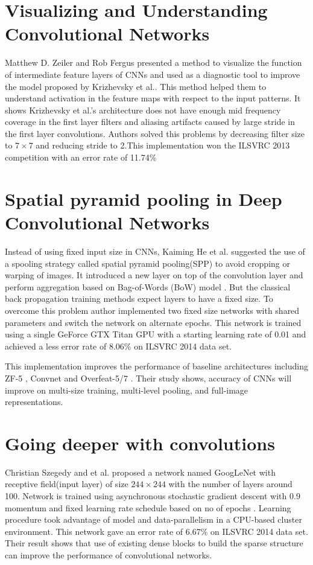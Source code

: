 \documentclass{article}
\begin{document}
\section{Visualizing and Understanding Convolutional Networks}

Matthew D. Zeiler and Rob Fergus\cite{Zeiler2013} presented a method to visualize the function of intermediate feature layers of CNNs and used as a diagnostic tool to improve  the model proposed by Krizhevsky et al.\cite{Krizhevsky2012a}. This method helped  them  to understand  activation in the feature maps with respect to the input patterns. It shows Krizhevsky et al.'s architecture does not have  enough mid frequency coverage in the first layer filters and aliasing artifacts caused by  large stride in the first layer convolutions. Authors solved this problems by decreasing filter size to $7\times7$ and reducing stride to 2.This implementation won the  ILSVRC 2013 competition with an error rate of 11.74\%



\section{Spatial pyramid pooling in Deep Convolutional Networks}
Instead of using fixed input size in CNNs, Kaiming He et al.\cite{He2014} suggested  the use of a spooling strategy called  spatial pyramid pooling(SPP)\cite{Grauman2005}\cite{1641019} to avoid cropping or warping of  images. It introduced a new layer on top of the convolution layer and perform aggregation  based on Bag-of-Words (BoW) model \cite{Sivic2003}. But the classical back propagation training methods expect layers to have a fixed   size. To overcome this problem author implemented two fixed size networks with shared parameters and switch the network on alternate epochs. This network is trained using a single GeForce GTX Titan GPU with a starting  learning rate of 0.01 and achieved  a less  error rate of 8.06\% on  ILSVRC 2014 data set. 
\par 
This implementation improves the performance of baseline architectures including ZF-5\cite{Zeiler2013} , Convnet \cite{Krizhevsky2012a} and Overfeat-5/7 \cite{Sermanet2013}. Their study shows, accuracy of CNNs will improve on multi-size training, multi-level pooling, and full-image representations. 
%




\section{Going deeper with convolutions }
Christian Szegedy and et al.\cite{Szegedy} proposed a network named GoogLeNet with receptive field(input layer) of size $244\times244$ with the number of layers around 100. Network is trained using asynchronous stochastic gradient descent with 0.9 momentum and fixed learning rate schedule based on  no of epochs 
. Learning procedure took advantage of  model and data-parallelism in a CPU-based cluster environment. This network gave an error rate of  6.67\%  on  ILSVRC 2014 data set. Their result shows that use of existing dense  blocks to  build the sparse structure can improve the  performance of convolutional networks.
\end{document}
